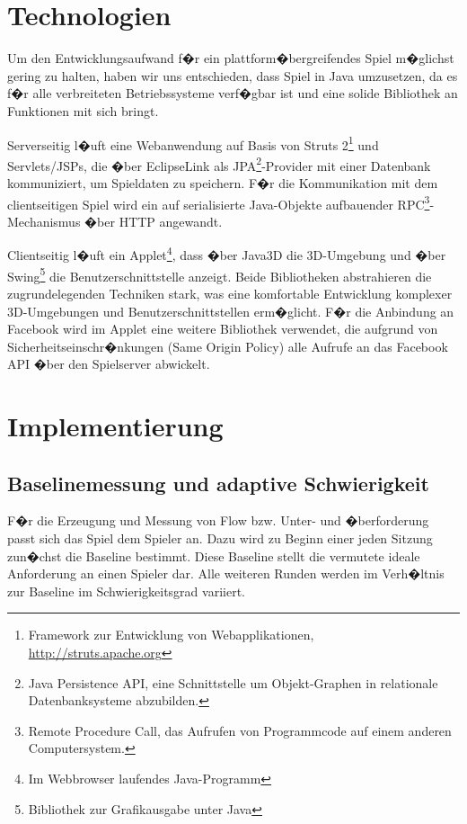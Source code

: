 \documentclass[a4paper,12pt]{scrartcl}
\begin{document}
\clearpage

\section{Technologien}
Um den Entwicklungsaufwand f�r ein plattform�bergreifendes Spiel m�glichst gering
zu halten, haben wir uns entschieden, dass Spiel in Java umzusetzen, da es f�r alle
verbreiteten Betriebssysteme verf�gbar ist und eine solide Bibliothek an Funktionen mit sich
bringt.

Serverseitig l�uft eine Webanwendung auf Basis von Struts 2\footnote{Framework zur Entwicklung von Webapplikationen, \url{http://struts.apache.org}} und Servlets/JSPs, die
�ber EclipseLink als JPA\footnote{Java Persistence API, eine Schnittstelle um
Objekt-Graphen in relationale Datenbanksysteme
abzubilden.}-Provider mit einer Datenbank kommuniziert, um Spieldaten zu speichern. F�r die Kommunikation mit dem clientseitigen Spiel wird ein auf serialisierte Java-Objekte aufbauender RPC\footnote{Remote Procedure Call, das Aufrufen von
Programmcode auf einem anderen Computersystem.}-Mechanismus �ber HTTP angewandt.

Clientseitig l�uft ein Applet\footnote{Im Webbrowser laufendes Java-Programm}, dass �ber Java3D die 3D-Umgebung und �ber Swing\footnote{Bibliothek zur Grafikausgabe unter Java} die Benutzerschnittstelle anzeigt. Beide Bibliotheken abstrahieren die zugrundelegenden Techniken stark, was eine komfortable Entwicklung komplexer 3D-Umgebungen und Benutzerschnittstellen erm�glicht. F�r die Anbindung an Facebook wird im Applet eine weitere Bibliothek verwendet, die aufgrund von Sicherheitseinschr�nkungen (Same Origin Policy) alle Aufrufe an das Facebook API �ber den Spielserver abwickelt.

\section{Implementierung}
\subsection{Baselinemessung und adaptive Schwierigkeit}
F�r die Erzeugung und Messung von Flow bzw. Unter- und �berforderung passt sich das
Spiel dem Spieler an. Dazu wird zu Beginn einer jeden Sitzung
zun�chst die Baseline bestimmt. Diese Baseline stellt die vermutete ideale
Anforderung an einen Spieler dar. Alle weiteren Runden werden im Verh�ltnis zur Baseline
im Schwierigkeitsgrad variiert.
\end{document}
